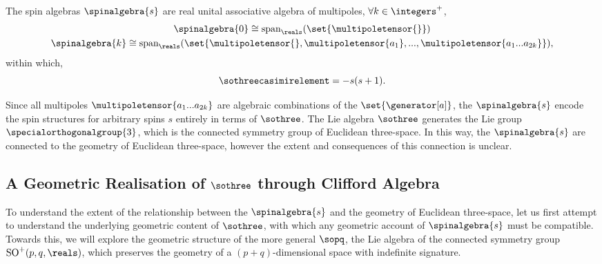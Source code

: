 \documentclass{article}
\begin{document}
\noindent The spin algebras $\spinalgebra{s}$ are real unital associative algebra of multipoles, $\forall k\in\integers^{+}$,
\begin{equation}
\begin{gathered}
    \spinalgebra{0}\cong\textup{span}_{\reals}(\set{\multipoletensor{}})\\
    \spinalgebra{k}\cong\textup{span}_{\reals}(\set{\multipoletensor{},\multipoletensor{a_{1}},...,\multipoletensor{a_{1}...a_{2k}}}),
\end{gathered}
\end{equation}
\noindent within which,
\begin{equation}
    \sothreecasimirelement=-s(s+1).
\end{equation}

Since all multipoles $\multipoletensor{a_{1}...a_{2k}}$ are algebraic combinations of the $\set{\generator[a]}$, the $\spinalgebra{s}$ encode the spin structures for arbitrary spins $s$ entirely in terms of $\sothree$. The Lie algebra $\sothree$ generates the Lie group $\specialorthogonalgroup{3}$, which is the connected symmetry group of Euclidean three-space. In this way, the $\spinalgebra{s}$ are connected to the geometry of Euclidean three-space, however the extent and consequences of this connection is unclear.

\subsection{A Geometric Realisation of \texorpdfstring{$\sothree$}{so(3)} through Clifford Algebra}\label{sec:clifford-introduction}

To understand the extent of the relationship between the $\spinalgebra{s}$ and the geometry of Euclidean three-space, let us first attempt to understand the underlying geometric content of $\sothree$, with which any geometric account of $\spinalgebra{s}$ must be compatible. Towards this, we will explore the geometric structure of the more general $\sopq$, the Lie algebra of the connected symmetry group $\textup{SO}^{+}(p,q,\reals)$, which preserves the geometry of a $(p{+}q)$-dimensional space with indefinite signature.
\end{document}
